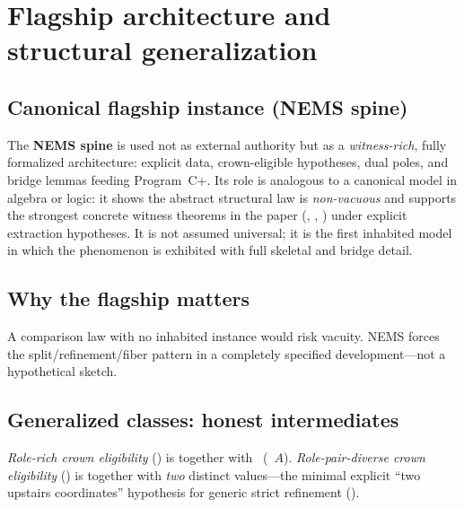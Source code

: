 \documentclass[11pt]{article}
\begin{document}
\section{Flagship architecture and structural generalization}\label{sec:flagship}

\subsection{Canonical flagship instance (NEMS spine)}\label{sec:flagship-instance}
The \textbf{NEMS spine} is used not as external authority but as a \emph{witness-rich}, fully formalized architecture: explicit  data, crown-eligible hypotheses, dual poles, and bridge lemmas feeding Program~C+.\linebreak
Its role is analogous to a canonical model in algebra or logic: it shows the abstract structural law is \emph{non-vacuous} and supports the strongest concrete witness theorems in the paper (, , ) under explicit extraction hypotheses. It is not assumed universal; it is the first inhabited model in which the phenomenon is exhibited with full skeletal and bridge detail.

\subsection{Why the flagship matters}\label{sec:flagship-matters}
A comparison law with no inhabited instance would risk vacuity. NEMS forces the split/refinement/fiber pattern in a completely specified development---not a hypothetical sketch.

\subsection{Generalized classes: honest intermediates}\label{sec:flagship-generalization}
\begin{definition}\label{def:role-rich}
\emph{Role-rich crown eligibility} () is  together with \allowbreak\ (~$A$). \emph{Role-pair-diverse crown eligibility} () is  together with \emph{two} distinct  values---the minimal explicit ``two upstairs coordinates'' hypothesis for generic strict refinement ().
\end{definition}
\end{document}

